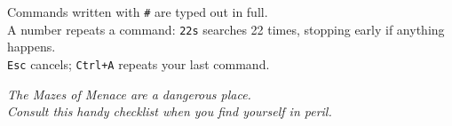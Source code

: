\documentclass[openany,10pt]{book}
\begin{document}
\par\vspace{1.4em}
{\centering
Commands written with \texttt{\#} are typed out in full.\\
A number repeats a command: \texttt{22s} searches 22 times, stopping early if anything happens.\\
\texttt{Esc} cancels; \texttt{Ctrl+A} repeats your last command.\par}
\normalsize
\clearpage
\thispagestyle{empty}
{\par\vspace{0.3em}
{\itshape The Mazes of Menace are a dangerous place.\\
Consult this handy checklist when you find yourself in peril.}\par}
\vspace{1.5em}
\footnotesize
\end{document}
